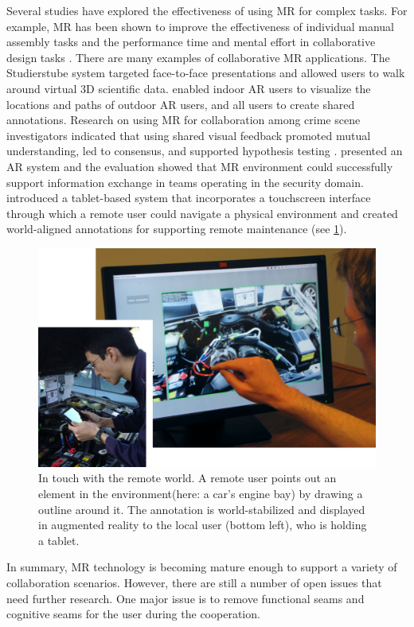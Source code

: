 Several studies have explored the effectiveness of using MR for complex tasks. For example, MR has been shown to improve the effectiveness of individual manual assembly tasks \cite{Baird1999} and the performance time and mental effort in collaborative design tasks \cite{Wang2011}. 
There are many examples of collaborative MR applications. The Studierstube system \cite{Szalavri1998} targeted face-to-face presentations and allowed users to walk around virtual 3D scientific data. \citet{Hollerer1999} enabled indoor AR users to visualize the locations and paths of outdoor AR users, and all users to create shared annotations.
Research on using MR for collaboration among crime scene investigators indicated that using shared visual feedback promoted mutual understanding, led to consensus, and supported hypothesis testing \cite{Poelman2012}. 
\citet{Datcu2014} presented an AR system and the evaluation showed that MR environment could successfully support information exchange in teams operating in the security domain.
\citet{Gauglitz2014} introduced a tablet-based system that incorporates a touchscreen interface through which a remote user could navigate a physical environment and created world-aligned annotations for supporting remote maintenance (see \figurename{\ref{fig:2-bg:drawingsandvirtualnavigation}}). 
\begin{figure}
	\centering
	\includegraphics[width=0.8\linewidth]{"figures/2-bg/drawings and virtual navigation"}
	\caption{In touch with the remote world. A remote user points out an element in the environment(here: a car's engine bay) by drawing a outline around it. The annotation is world-stabilized and displayed in augmented reality to the local user (bottom left), who is holding a tablet.}
	\label{fig:2-bg:drawingsandvirtualnavigation}
\end{figure}
In summary, MR technology is becoming mature enough to support a variety of collaboration scenarios. However, there are still a number of open issues that need further research. One major issue is to remove functional seams and cognitive seams for the user during the cooperation.

